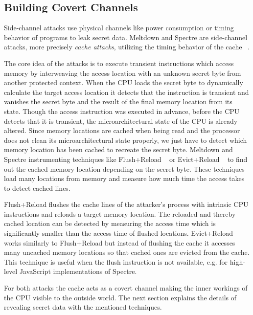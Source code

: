 \documentclass[a4paper,oneside,openright] {scrreprt}
\begin{document}
 \subsection{Building Covert Channels}
\label{ch:intro:motivation:A}

Side-channel attacks use physical channels like power consumption or timing behavior of programs to
leak secret data. Meltdown and Spectre are side-channel attacks, more precisely \textit{cache attacks}, 
utilizing the timing behavior of the cache ~\cite{osvik2006cache}.

The core idea of the attacks is to execute transient instructions 
which access memory by interweaving the access location with an unknown secret byte from another protected context. 
When the CPU loads the secret byte to dynamically calculate the target access location 
it detects that the instruction is transient and vanishes the secret byte and the result of the final memory location from its state. 
Though the access instruction was executed in advance, before the CPU detects that it is transient, the microarchitectural state
 of the CPU is already altered.
 Since memory locations are cached when being read and the processor does not clean its microarchitectural state properly,
 we just have to detect which memory location has been cached to recreate the secret byte.
 Meltdown and Spectre instrumenting techniques like Flush+Reload ~\cite{yarom2014flush} 
 or Evict+Reload ~\cite{gruss2015cache} to find out the cached memory location depending on the secret byte.
These techniques load many locations from memory and measure how much time the access takes to detect cached lines.

Flush+Reload flushes the cache lines of the attacker's process with intrinsic CPU instructions and reloads a target memory location.
The reloaded and thereby cached location can be detected by measuring the access time which is significantly smaller than the access
time of flushed locations.
Evict+Reload works similarly to Flush+Reload but instead of flushing the cache it accesses many uncached memory
locations so that cached ones are evicted from the cache.
This technique is useful when the flush instruction is not available, e.g. for high-level JavaScript implementations of Spectre. 

For both attacks the cache acts as a covert channel making the inner workings of the CPU visible to the outside world. 
The next section explains the details of revealing secret data with the mentioned techniques. 
\end{document}
